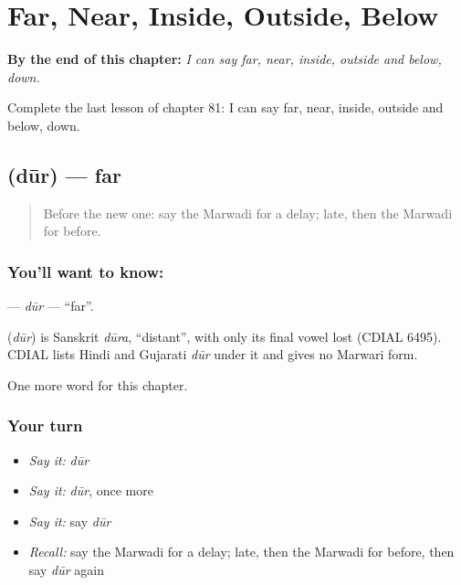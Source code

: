 
\chapter{Far, Near, Inside, Outside, Below}
\label{ch:mw-far-near-inside-outside-below}

\begin{chapteropening}
\textbf{By the end of this chapter:} \emph{I can say far, near, inside, outside and below, down.}

Complete the last lesson of chapter 81: I can say far, near, inside, outside and below, down.
\end{chapteropening}

\section[\texorpdfstring{\mw{दूर} (dūr)}{दूर (dūr)}]{ (dūr) — far}

\label{lesson:MW-C81-dur}



\begin{quote}
Before the new one: say the Marwadi for a delay; late, then the Marwadi for before.
\end{quote}

\subsection*{You'll want to know: }
\textbf{} — \emph{dūr} — \textquotedblleft{}far\textquotedblright{}.

\begin{cousinweb}
\textbf{} (\emph{dūr}) is Sanskrit \emph{dūra}, \textquotedblleft{}distant\textquotedblright{}, with only its final vowel lost (CDIAL 6495). CDIAL lists Hindi and Gujarati \emph{dūr} under it and gives no Marwari form.
\end{cousinweb}

\begin{grammarlens}[title={What you've built}]
One more word for this chapter.
\end{grammarlens}

\subsection*{Your turn}
\begin{itemize}
\raggedright
  \item \emph{Say it:} \emph{dūr}
  \item \emph{Say it:} \emph{dūr}, once more
  \item \emph{Say it:} say \emph{dūr}
  \item \emph{Recall:} say the Marwadi for a delay; late, then the Marwadi for before, then say \emph{dūr} again
\end{itemize}

